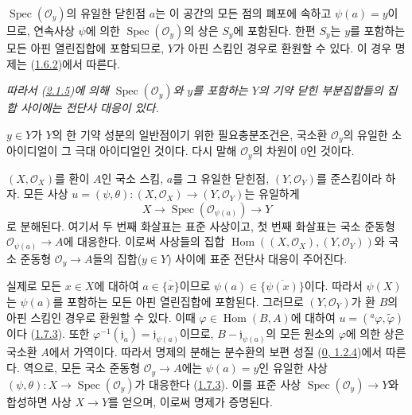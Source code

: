 $\operatorname{Spec}(\mathscr{O}_y)$의 유일한 닫힌점 $a$는 이 공간의
모든 점의 폐포에 속하고 $\psi(a)=y$이므로, 연속사상 $\psi$에 의한
$\operatorname{Spec}(\mathscr{O}_y)$의 상은 $S_y$에 포함된다. 한편
$S_y$는 $y$를 포함하는 모든 아핀 열린집합에 포함되므로, $Y$가 아핀
스킴인 경우로 환원할 수 있다. 이 경우 명제는
(\hyperref[I.1.6.2-ko]{1.6.2})에서 따른다.

\emph{따라서 (\hyperref[I.2.1.5-ko]{2.1.5})에 의해
$\operatorname{Spec}(\mathscr{O}_y)$와 $y$를 포함하는 $Y$의 기약
닫힌 부분집합들의 집합 사이에는 전단사 대응이 있다.}

\begin{corollary}[2.4.3]
\label{I.2.4.3-ko}
$y\in Y$가 $Y$의 한 기약 성분의 일반점이기 위한 필요충분조건은,
국소환 $\mathscr{O}_y$의 유일한 소 아이디얼이 그 극대 아이디얼인
것이다. 다시 말해 $\mathscr{O}_y$의 차원이 $0$인 것이다.
\end{corollary}

\begin{proposition}[2.4.4]
\label{I.2.4.4-ko}
$(X,\mathscr{O}_X)$를 환이 $A$인 국소 스킴, $a$를 그 유일한 닫힌점,
$(Y,\mathscr{O}_Y)$를 준스킴이라 하자. 모든 사상
$u=(\psi,\theta):(X,\mathscr{O}_X)\to(Y,\mathscr{O}_Y)$는 유일하게
\[
  X\longrightarrow\operatorname{Spec}(\mathscr{O}_{\psi(a)})
  \longrightarrow Y
\]
로 분해된다. 여기서 두 번째 화살표는 표준 사상이고, 첫 번째 화살표는
국소 준동형 $\mathscr{O}_{\psi(a)}\to A$에 대응한다. 이로써 사상들의
집합
$\operatorname{Hom}((X,\mathscr{O}_X),(Y,\mathscr{O}_Y))$와 국소
준동형 $\mathscr{O}_y\to A$들의 집합($y\in Y$) 사이에 표준 전단사
대응이 주어진다.
\end{proposition}

실제로 모든 $x\in X$에 대하여 $a\in\overline{\{x\}}$이므로
$\psi(a)\in\overline{\{\psi(x)\}}$이다. 따라서 $\psi(X)$는
$\psi(a)$를 포함하는 모든 아핀 열린집합에 포함된다. 그러므로
$(Y,\mathscr{O}_Y)$가 환 $B$의 아핀 스킴인 경우로 환원할 수 있다.
이때 $\varphi\in\operatorname{Hom}(B,A)$에 대하여
$u=({}^a\varphi,\widetilde{\varphi})$이다
(\hyperref[I.1.7.3-ko]{1.7.3}). 또한
$\varphi^{-1}(\mathfrak{j}_a)=\mathfrak{j}_{\psi(a)}$이므로,
$B-\mathfrak{j}_{\psi(a)}$의 모든 원소의 $\varphi$에 의한 상은
국소환 $A$에서 가역이다. 따라서 명제의 분해는 분수환의 보편 성질
(\hyperref[0.1.2.4-ko]{0, 1.2.4})에서 따른다. 역으로, 모든 국소
준동형 $\mathscr{O}_y\to A$에는 $\psi(a)=y$인 유일한 사상
$(\psi,\theta):X\to\operatorname{Spec}(\mathscr{O}_y)$가 대응한다
(\hyperref[I.1.7.3-ko]{1.7.3}). 이를 표준 사상
$\operatorname{Spec}(\mathscr{O}_y)\to Y$와 합성하면 사상 $X\to Y$를
얻으며, 이로써 명제가 증명된다.

